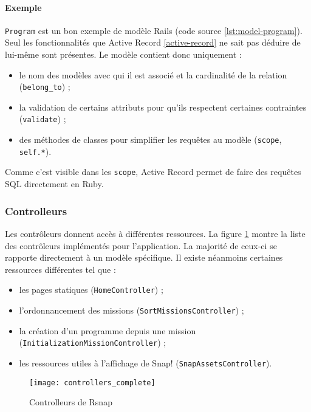 \paragraph{Exemple} \texttt{Program} est un bon exemple de modèle Rails (code source \ref{lst:model-program}). Seul les fonctionnalités que Active Record \ref{active-record} ne sait pas déduire de lui-même sont présentes. Le modèle contient donc uniquement :
\begin{itemize}
  \item le nom des modèles avec qui il est associé et la cardinalité de la relation (\texttt{belong\_to}) ;
  \item la validation de certains attributs pour qu'ils respectent certaines contraintes (\texttt{validate}) ;
  \item des méthodes de classes pour simplifier les requêtes au modèle (\texttt{scope}, \texttt{self.*}).
\end{itemize}

Comme c'est visible dans les \texttt{scope}, Active Record permet de faire des requêtes SQL directement en Ruby. 


\subsubsection{Controlleurs}
Les contrôleurs donnent accès à différentes ressources. La figure \ref{fig:controllers} montre la liste des contrôleurs implémentés pour l'application. La majorité de ceux-ci se rapporte directement à un modèle spécifique. Il existe néanmoins certaines ressources différentes tel que : 
\begin{itemize}
  \item les pages statiques (\texttt{HomeController}) ;
  \item l'ordonnancement des missions (\texttt{SortMissionsController}) ; 
  \item la création d'un programme depuis une mission (\texttt{InitializationMissionController}) ;
  \item les ressources utiles à l'affichage de Snap! (\texttt{SnapAssetsController}).
\end{itemize}
\begin{figure}
 \begin{center}
   \texttt{[image: controllers\_complete]}
   \caption{Controlleurs de Rsnap}
   \label{fig:controllers}
 \end{center}
\end{figure}

